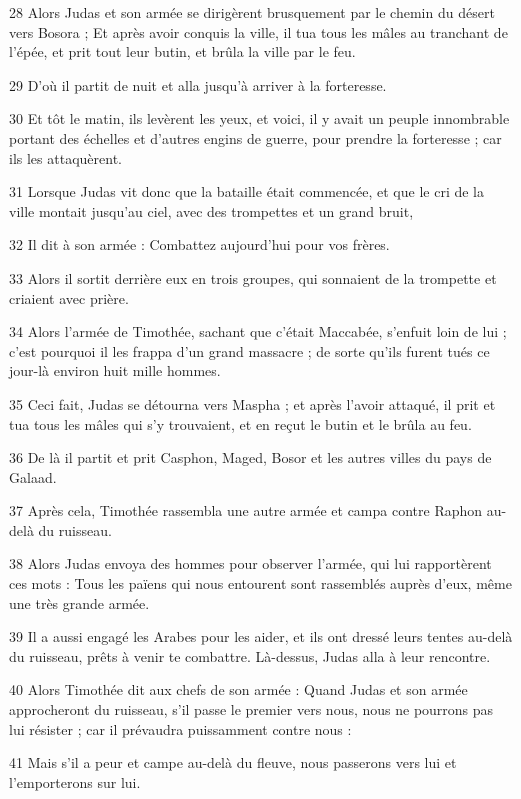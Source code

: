 \par 28 Alors Judas et son armée se dirigèrent brusquement par le chemin du désert vers Bosora ; Et après avoir conquis la ville, il tua tous les mâles au tranchant de l'épée, et prit tout leur butin, et brûla la ville par le feu.
\par 29 D'où il partit de nuit et alla jusqu'à arriver à la forteresse.
\par 30 Et tôt le matin, ils levèrent les yeux, et voici, il y avait un peuple innombrable portant des échelles et d'autres engins de guerre, pour prendre la forteresse ; car ils les attaquèrent.
\par 31 Lorsque Judas vit donc que la bataille était commencée, et que le cri de la ville montait jusqu'au ciel, avec des trompettes et un grand bruit,
\par 32 Il dit à son armée : Combattez aujourd'hui pour vos frères.
\par 33 Alors il sortit derrière eux en trois groupes, qui sonnaient de la trompette et criaient avec prière.
\par 34 Alors l'armée de Timothée, sachant que c'était Maccabée, s'enfuit loin de lui ; c'est pourquoi il les frappa d'un grand massacre ; de sorte qu'ils furent tués ce jour-là environ huit mille hommes.
\par 35 Ceci fait, Judas se détourna vers Maspha ; et après l'avoir attaqué, il prit et tua tous les mâles qui s'y trouvaient, et en reçut le butin et le brûla au feu.
\par 36 De là il partit et prit Casphon, Maged, Bosor et les autres villes du pays de Galaad.
\par 37 Après cela, Timothée rassembla une autre armée et campa contre Raphon au-delà du ruisseau.
\par 38 Alors Judas envoya des hommes pour observer l'armée, qui lui rapportèrent ces mots : Tous les païens qui nous entourent sont rassemblés auprès d'eux, même une très grande armée.
\par 39 Il a aussi engagé les Arabes pour les aider, et ils ont dressé leurs tentes au-delà du ruisseau, prêts à venir te combattre. Là-dessus, Judas alla à leur rencontre.
\par 40 Alors Timothée dit aux chefs de son armée : Quand Judas et son armée approcheront du ruisseau, s'il passe le premier vers nous, nous ne pourrons pas lui résister ; car il prévaudra puissamment contre nous :
\par 41 Mais s'il a peur et campe au-delà du fleuve, nous passerons vers lui et l'emporterons sur lui.
